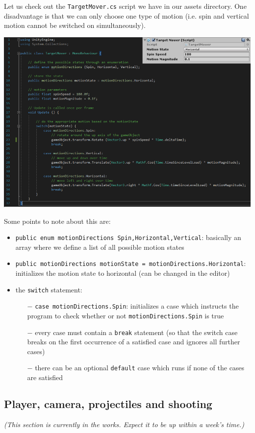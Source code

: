 \documentclass{article}[a4paper,12pt]
\theoremstyle{definition}
\begin{document}
Let us check out the \texttt{TargetMover.cs} script we have in our assets directory. One disadvantage is that we can only choose one type of motion (i.e. spin and vertical motion cannot be switched on simultaneously).
\begin{center}\includegraphics[width=\textwidth]{target_mover_enum.png}\end{center}
\pagebreak
Some points to note about this are:
\begin{itemize}
	\item \texttt{public enum motionDirections {Spin,Horizontal,Vertical}}: basically an array where we define a list of all possible motion states
	\item \texttt{public motionDirections motionState = motionDirections.Horizontal}: initializes the motion state to horizontal (can be changed in the editor)
	\item the \texttt{switch} statement:
	\begin{itemize}
		\item[$-$] \texttt{case motionDirections.Spin}: initializes a case which instructs the program to check whether or not \texttt{motionDirections.Spin} is true
		\item[$-$] every case must contain a \texttt{break} statement (so that the switch case breaks on the first occurrence of a satisfied case and ignores all further cases)
		\item[$-$] there can be an optional \texttt{default} case which runs if none of the cases are satisfied
	\end{itemize}
\end{itemize}
\subsection{Player, camera, projectiles and shooting}
\textit{(This section is currently in the works. Expect it to be up within a week's time.)}


\hrulefill

\end{document}
